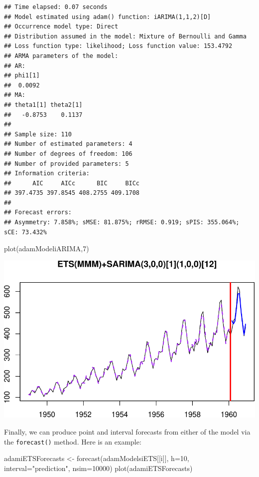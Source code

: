 \documentclass[
]{book}
\newenvironment{Shaded}{\begin{snugshade}}{\end{snugshade}}
\newcommand{\AttributeTok}[1]{\textcolor[rgb]{0.77,0.63,0.00}{#1}}
\newcommand{\DecValTok}[1]{\textcolor[rgb]{0.00,0.00,0.81}{#1}}
\newcommand{\FunctionTok}[1]{\textcolor[rgb]{0.00,0.00,0.00}{#1}}
\newcommand{\NormalTok}[1]{#1}
\newcommand{\OtherTok}[1]{\textcolor[rgb]{0.56,0.35,0.01}{#1}}
\newcommand{\StringTok}[1]{\textcolor[rgb]{0.31,0.60,0.02}{#1}}
\theoremstyle{definition}
\theoremstyle{definition}
\theoremstyle{definition}
\theoremstyle{definition}
\theoremstyle{remark}
\begin{document}
\begin{verbatim}
## Time elapsed: 0.07 seconds
## Model estimated using adam() function: iARIMA(1,1,2)[D]
## Occurrence model type: Direct
## Distribution assumed in the model: Mixture of Bernoulli and Gamma
## Loss function type: likelihood; Loss function value: 153.4792
## ARMA parameters of the model:
## AR:
## phi1[1] 
##  0.0092 
## MA:
## theta1[1] theta2[1] 
##   -0.8753    0.1137 
## 
## Sample size: 110
## Number of estimated parameters: 4
## Number of degrees of freedom: 106
## Number of provided parameters: 5
## Information criteria:
##      AIC     AICc      BIC     BICc 
## 397.4735 397.8545 408.2755 409.1708 
## 
## Forecast errors:
## Asymmetry: 7.858%; sMSE: 81.875%; rRMSE: 0.919; sPIS: 355.064%; sCE: 73.432%
\end{verbatim}

\begin{Shaded}
\begin{Highlighting}[]
\FunctionTok{plot}\NormalTok{(adamModeliARIMA,}\DecValTok{7}\NormalTok{)}
\end{Highlighting}
\end{Shaded}

\includegraphics{adam_files/figure-latex/unnamed-chunk-121-1.pdf}

Finally, we can produce point and interval forecasts from either of the model via the \texttt{forecast()} method. Here is an example:

\begin{Shaded}
\begin{Highlighting}[]
\NormalTok{adamiETSForecasts }\OtherTok{\textless{}{-}} \FunctionTok{forecast}\NormalTok{(adamModelsiETS[[i]], }\AttributeTok{h=}\DecValTok{10}\NormalTok{,}
                              \AttributeTok{interval=}\StringTok{"prediction"}\NormalTok{, }\AttributeTok{nsim=}\DecValTok{10000}\NormalTok{)}
\FunctionTok{plot}\NormalTok{(adamiETSForecasts)}
\end{Highlighting}
\end{Shaded}
\end{document}
